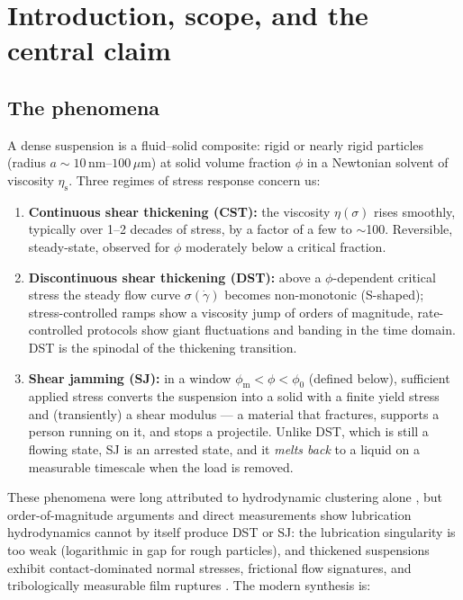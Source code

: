 \documentclass[11pt]{article}
\newcommand{\phiO}{\phi_{0}}
\newcommand{\phiM}{\phi_{\mathrm{m}}}
\newcommand{\etas}{\eta_{\mathrm{s}}}
\newcommand{\gdot}{\dot{\gamma}}
\begin{document}
\begin{abstract}
silica/cornstarch lifetime inversion --- and each confrontation is converted into a discriminating experiment.
\end{abstract}

\tableofcontents
\newpage

\section{Introduction, scope, and the central claim}

\subsection{The phenomena}
A dense suspension is a fluid–solid composite: rigid or nearly rigid particles (radius $a\sim 10\,\mathrm{nm}$--$100\,\mu\mathrm{m}$) at solid volume fraction $\phi$ in a Newtonian solvent of viscosity $\etas$. Three regimes of stress response concern us:

\begin{enumerate}
\item \textbf{Continuous shear thickening (CST):} the viscosity $\eta(\sigma)$ rises smoothly, typically over 1--2 decades of stress, by a factor of a few to $\sim$100. Reversible, steady-state, observed for $\phi$ moderately below a critical fraction.
\item \textbf{Discontinuous shear thickening (DST):} above a $\phi$-dependent critical stress the steady flow curve $\sigma(\gdot)$ becomes non-monotonic (S-shaped); stress-controlled ramps show a viscosity jump of orders of magnitude, rate-controlled protocols show giant fluctuations and banding in the time domain. DST is the spinodal of the thickening transition.
\item \textbf{Shear jamming (SJ):} in a window $\phiM < \phi < \phiO$ (defined below), sufficient applied stress converts the suspension into a solid with a finite yield stress and (transiently) a shear modulus --- a material that fractures, supports a person running on it, and stops a projectile. Unlike DST, which is still a flowing state, SJ is an arrested state, and it \emph{melts back} to a liquid on a measurable timescale when the load is removed.
\end{enumerate}

These phenomena were long attributed to hydrodynamic clustering alone \cite{brady1985,wagner2009}, but order-of-magnitude arguments and direct measurements show lubrication hydrodynamics cannot by itself produce DST or SJ: the lubrication singularity is too weak (logarithmic in gap for rough particles), and thickened suspensions exhibit contact-dominated normal stresses, frictional flow signatures, and tribologically measurable film ruptures \cite{seto2013,mari2014,lin2015,royer2016,comtet2017,clavaud2017,hsiao2017}. The modern synthesis \cite{morris2020,ness2022,denn2018} is:
\end{document}
